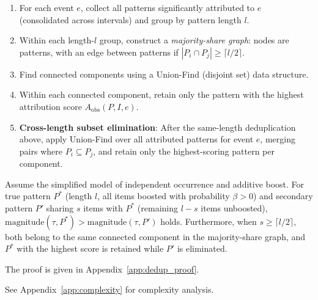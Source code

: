 \begin{enumerate}
\item For each event $e$, collect all patterns significantly attributed to $e$
(consolidated across intervals) and group by pattern length $l$.
\item Within each length-$l$ group, construct a \emph{majority-share graph}:
nodes are patterns, with an edge between patterns if
$|P_i \cap P_j| \geq \lceil l/2 \rceil$.
\item Find connected components using a Union-Find (disjoint set) data structure.
\item Within each connected component, retain only the pattern with the highest
attribution score $A_{\text{obs}}(P, I, e)$.
\item \textbf{Cross-length subset elimination}: After the same-length deduplication above,
apply Union-Find over all attributed patterns for event $e$,
merging pairs where $P_i \subseteq P_j$,
and retain only the highest-scoring pattern per component.
\end{enumerate}

\begin{claim}\label{prop:dedup}
Assume the simplified model of independent occurrence and additive boost.
For true pattern $P^*$ (length $l$, all items boosted with probability $\beta > 0$)
and secondary pattern $P'$ sharing $s$ items with $P^*$ (remaining $l-s$ items unboosted),
$\text{magnitude}(\tau, P^*) > \text{magnitude}(\tau, P')$ holds.
Furthermore, when $s \geq \lceil l/2 \rceil$, both belong to the same connected component
in the majority-share graph, and $P^*$ with the highest score is retained
while $P'$ is eliminated.
\end{claim}

The proof is given in Appendix~\ref{app:dedup_proof}.

See Appendix~\ref{app:complexity} for complexity analysis.

